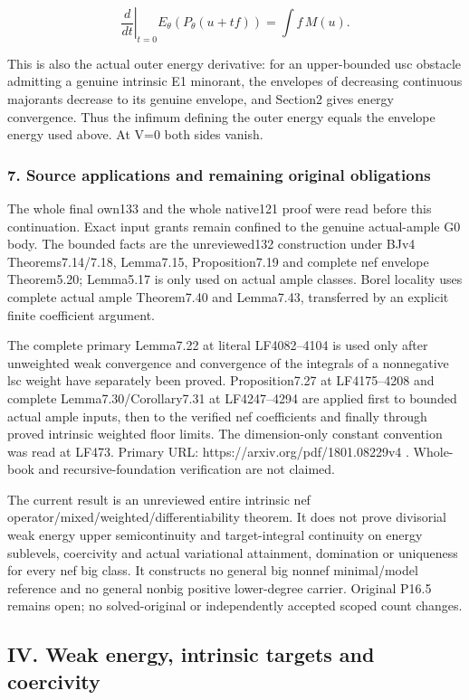 \documentclass[
  10pt,
]{article}
\begin{document}
\[\left.\frac d{dt}\right|_{t=0}E_\theta(P_\theta(u+t f))
=\int f\,M(u).\]

This is also the actual outer energy derivative: for an upper-bounded
usc obstacle admitting a genuine intrinsic E1 minorant, the envelopes of
decreasing continuous majorants decrease to its genuine envelope, and
Section2 gives energy convergence. Thus the infimum defining the outer
energy equals the envelope energy used above. At V=0 both sides vanish.

\subsubsection{7. Source applications and remaining original
obligations}\label{source-applications-and-remaining-original-obligations}

The whole final own133 and the whole native121 proof were read before
this continuation. Exact input grants remain confined to the genuine
actual-ample G0 body. The bounded facts are the unreviewed132
construction under BJv4 Theorems7.14/7.18, Lemma7.15, Proposition7.19
and complete nef envelope Theorem5.20; Lemma5.17 is only used on actual
ample classes. Borel locality uses complete actual ample Theorem7.40 and
Lemma7.43, transferred by an explicit finite coefficient argument.

The complete primary Lemma7.22 at literal LF4082--4104 is used only
after unweighted weak convergence and convergence of the integrals of a
nonnegative lsc weight have separately been proved. Proposition7.27 at
LF4175--4208 and complete Lemma7.30/Corollary7.31 at LF4247--4294 are
applied first to bounded actual ample inputs, then to the verified nef
coefficients and finally through proved intrinsic weighted floor limits.
The dimension-only constant convention was read at LF473. Primary URL:
https://arxiv.org/pdf/1801.08229v4 . Whole-book and recursive-foundation
verification are not claimed.

The current result is an unreviewed entire intrinsic nef
operator/mixed/weighted/differentiability theorem. It does not prove
divisorial weak energy upper semicontinuity and target-integral
continuity on energy sublevels, coercivity and actual variational
attainment, domination or uniqueness for every nef big class. It
constructs no general big nonnef minimal/model reference and no general
nonbig positive lower-degree carrier. Original P16.5 remains open; no
solved-original or independently accepted scoped count changes.

\subsection{IV. Weak energy, intrinsic targets and
coercivity}\label{iv.-weak-energy-intrinsic-targets-and-coercivity}
\end{document}

